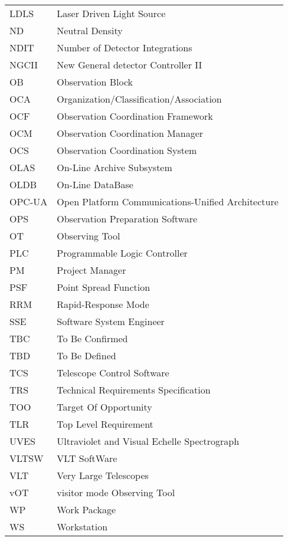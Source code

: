 \begin{longtable}{ |l|l| }
LDLS & Laser Driven Light Source \\
ND & Neutral Density \\
NDIT & Number of Detector Integrations \\
NGCII & New General detector Controller II \\
OB & Observation Block \\
OCA & Organization/Classification/Association \\
OCF & Observation Coordination Framework \\
OCM & Observation Coordination Manager \\
OCS & Observation Coordination System \\
OLAS & On-Line Archive Subsystem \\
OLDB & On-Line DataBase \\
OPC-UA & Open Platform Communications-Unified Architecture \\
OPS & Observation Preparation Software \\
OT & Observing Tool \\
PLC & Programmable Logic Controller \\
PM & Project Manager \\
PSF & Point Spread Function \\
RRM & Rapid-Response Mode \\
SSE & Software System Engineer \\
TBC & To Be Confirmed \\
TBD & To Be Defined \\
TCS & Telescope Control Software \\
TRS & Technical Requirements Specification \\
TOO & Target Of Opportunity \\
TLR & Top Level Requirement \\
UVES & Ultraviolet and Visual Echelle Spectrograph \\
VLTSW & VLT SoftWare \\
VLT & Very Large Telescopes \\
vOT & visitor mode Observing Tool \\
WP & Work Package \\
WS & Workstation \\
\end{longtable}
